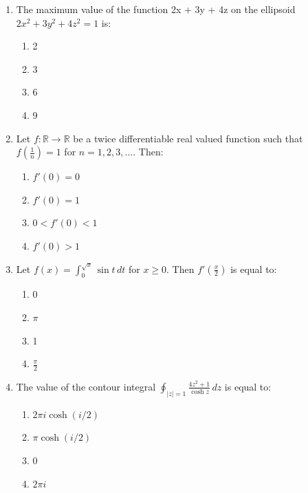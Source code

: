 \documentclass[journal,cmex10]{IEEEtran}
\theoremstyle{remark}
\numberwithin{equation}{enumi}
\numberwithin{figure}{enumi}
\begin{document}
\begin{enumerate}[label=\arabic*)]
    \item The maximum value of the function 2x + 3y + 4z  on the ellipsoid $2x^2 + 3y^2 + 4z^2 = 1$ is:
    \bigskip
    \hfill {}
    \begin{enumerate}[label=\alph*)]
        \item 2
        \item 3
        \item 6
        \item 9
    \end{enumerate}
    \bigskip

    \item Let $f: \mathbb{R} \to \mathbb{R}$ be a twice differentiable real valued function such that $f\left(\frac{1}{n}\right) = 1$ for  $n = 1, 2, 3, \dots$. Then:
    \bigskip
    \hfill {}
    \begin{enumerate}[label=\alph*)]
        \item $f'(0) = 0$
        \item  $f'(0) = 1$
        \item $0 < f'(0) < 1$
        \item $f'(0) > 1$
    \end{enumerate}
    \bigskip

    \item Let $f(x) = \int_{0}^{\sqrt{x}} \sin t \, dt$ for  $x \geq 0$. Then $f'\left(\frac{x}{2}\right)$ is equal to:
    \bigskip
    \hfill {}
    \begin{enumerate}[label=\alph*)]
        \item 0
        \item $\pi$
        \item 1
        \item $\frac{\pi}{2}$
    \end{enumerate}
    \bigskip

    \item The value of the contour integral $\oint_{|z|=1} \frac{4z^2 + 1}{\cosh z} \, dz$ is equal to:
    \bigskip
    \hfill {}
    \begin{enumerate}[label=\alph*)]
        \item $2\pi i \cosh(i/2)$
        \item $\pi \cosh(i/2)$
        \item 0
        \item $2\pi i$
    \end{enumerate}
    \bigskip


\end{enumerate}
\end{document}
